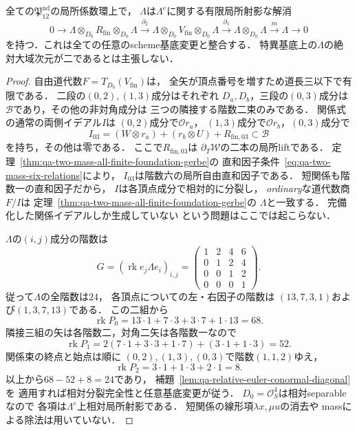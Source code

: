 \begin{proposition}[二mass全有限族の短い相対対角解消]
\label{prop:qa-two-mass-short-relative-diagonal}
全ての$\mathfrak P_{12}^{\mathrm{nd}}$の局所係数環上で，
$\Lambda$は$\Lambda^e$に関する有限局所射影な解消
\[
 0\longrightarrow
 \Lambda\otimes_{D_0}R_{\mathrm{fin}}\otimes_{D_0}\Lambda
 \xrightarrow{\partial_2}
 \Lambda\otimes_{D_0}V_{\mathrm{fin}}\otimes_{D_0}\Lambda
 \xrightarrow{\partial_1}
 \Lambda\otimes_{D_0}\Lambda
 \xrightarrow{m}\Lambda\longrightarrow0
 \tag{DR12}\label{eq:qa-two-mass-relative-diagonal}
\]
を持つ．これは全ての任意のscheme基底変更と整合する．
特異基底上の$\Lambda$の絶対大域次元が二であるとは主張しない．
\end{proposition}
\begin{proof}
自由道代数$F=T_{D_0}(V_{\mathrm{fin}})$は，
全矢が頂点番号を増すため道長三以下で有限である．
二段の$(0,2),(1,3)$成分はそれぞれ
$D_a,D_b$，三段の$(0,3)$成分は
$\mathcal B$であり，その他の非対角成分は
三つの隣接する階数二束のみである．
関係式の通常の両側イデアル$I$は
$(0,2)$成分で$\mathcal O r_a$，
$(1,3)$成分で$\mathcal O r_b$，$(0,3)$成分で
\[
 I_{03}=
  (W\otimes r_a)+(r_b\otimes U)+
  R_{{\mathrm{fin}},03}
 \subset\mathcal B
\]
を持ち，その他は零である．
ここで$R_{{\mathrm{fin}},03}$は
$\partial_T\mathcal W$の二本の局所liftである．
定理~\ref{thm:qa-two-mass-all-finite-foundation-gerbe}の
直和因子条件~\eqref{eq:qa-two-mass-six-relations}により，
$I_{03}$は階数六の局所自由直和因子である．
短関係も階数一の直和因子だから，
$I$は各頂点成分で相対的に分裂し，
\emph{ordinary}な道代数商$F/I$は
定理~\ref{thm:qa-two-mass-all-finite-foundation-gerbe}の
$\Lambda$と一致する．
完備化した関係イデアルしか生成していない
という問題はここでは起こらない．

$\Lambda$の$(i,j)$成分の階数は
\[
 G=(\operatorname{rk}e_j\Lambda e_i)_{i,j}
 =\begin{pmatrix}
 1&2&4&6\\0&1&2&4\\0&0&1&2\\0&0&0&1
 \end{pmatrix}.
\]
従って$\Lambda$の全階数は$24$，
各頂点についての左・右因子の階数は
$(13,7,3,1)$および$(1,3,7,13)$である．
この二組から
\[
 \operatorname{rk}P_0
 =13\cdot1+7\cdot3+3\cdot7+1\cdot13=68.
\]
隣接三組の矢は各階数二，対角二矢は各階数一なので
\[
 \operatorname{rk}P_1
 =2(7\cdot1+3\cdot3+1\cdot7)
   +(3\cdot1+1\cdot3)=52.
\]
関係束の終点と始点は順に
$(0,2),(1,3),(0,3)$で階数$(1,1,2)$ゆえ，
\[
 \operatorname{rk}P_2
 =3\cdot1+1\cdot3+2\cdot1=8.
\]
以上から$68-52+8=24$であり，
補題~\ref{lem:qa-relative-euler-conormal-diagonal}を
適用すれば相対分裂完全性と任意基底変更が従う．
$D_0=\mathcal O_S^4$は相対separableなので
各項は$\Lambda^e$上相対局所射影である．
短関係の線形項$\lambda x,\mu u$の消去や
massによる除法は用いていない．
\end{proof}

